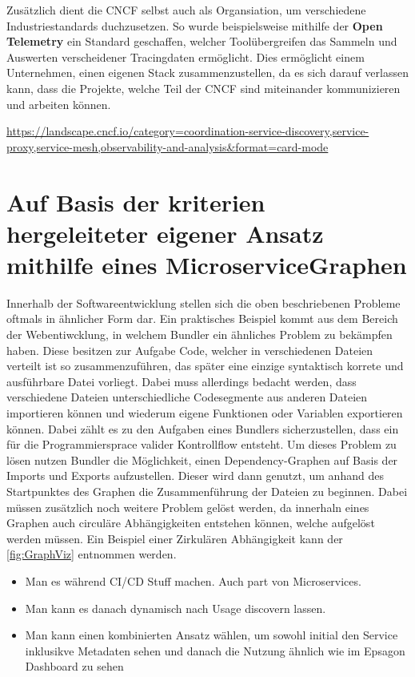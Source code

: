 \documentclass[
	12pt,
	BCOR=5mm,
	DIV=12,
	headinclude=on,
	footinclude=off,
	parskip=half,
	bibliography=totoc,
	listof=entryprefix,
	toc=listof,
	numbers=noenddot,
	plainfootsepline
]{scrreprt}
\begin{document}
Zusätzlich dient die \ac{CNCF} selbst auch als Organsiation, um verschiedene Industriestandards duchzusetzen. So wurde beispielsweise mithilfe der \textbf{Open Telemetry} ein Standard geschaffen, welcher Toolübergreifen das Sammeln und Auswerten verscheidener Tracingdaten ermöglicht. Dies ermöglicht einem Unternehmen, einen eigenen Stack zusammenzustellen, da es sich darauf verlassen kann, dass die Projekte, welche Teil der \ac{CNCF} sind miteinander kommunizieren und arbeiten können.

\url{https://landscape.cncf.io/category=coordination-service-discovery,service-proxy,service-mesh,observability-and-analysis&format=card-mode}

\section{Auf Basis der kriterien hergeleiteter eigener Ansatz mithilfe eines MicroserviceGraphen}

Innerhalb der Softwareentwicklung stellen sich die oben beschriebenen Probleme oftmals in ähnlicher Form dar. Ein praktisches Beispiel kommt aus dem Bereich der Webentiwcklung, in welchem Bundler ein ähnliches Problem zu bekämpfen haben. Diese besitzen zur Aufgabe Code, welcher in verschiedenen Dateien verteilt ist so zusammenzuführen, das später eine einzige syntaktisch korrete und ausführbare Datei vorliegt. Dabei muss allerdings bedacht werden, dass verschiedene Dateien unterschiedliche Codesegmente aus anderen Dateien importieren können und wiederum eigene Funktionen oder Variablen exportieren können. Dabei zählt es zu den Aufgaben eines Bundlers sicherzustellen, dass ein für die Programmiersprace valider Kontrollflow entsteht. Um dieses Problem zu lösen nutzen Bundler die Möglichkeit, einen Dependency-Graphen auf Basis der Imports und Exports aufzustellen. Dieser wird dann genutzt, um anhand des Startpunktes des Graphen die Zusammenführung der Dateien zu beginnen. Dabei müssen zusätzlich noch weitere Problem gelöst werden, da innerhaln eines Graphen auch circuläre Abhängigkeiten entstehen können, welche aufgelöst werden müssen. Ein Beispiel einer Zirkulären Abhängigkeit kann der \autoref{fig:GraphViz} entnommen werden.

\begin{itemize}
	\item Man es während CI/CD Stuff machen. Auch part von Microservices.
	\item Man kann es danach dynamisch nach Usage discovern lassen.
	\item Man kann einen kombinierten Ansatz wählen, um sowohl initial den Service inklusikve Metadaten sehen und danach die Nutzung ähnlich wie im Epsagon Dashboard zu sehen
\end{itemize}
\end{document}
